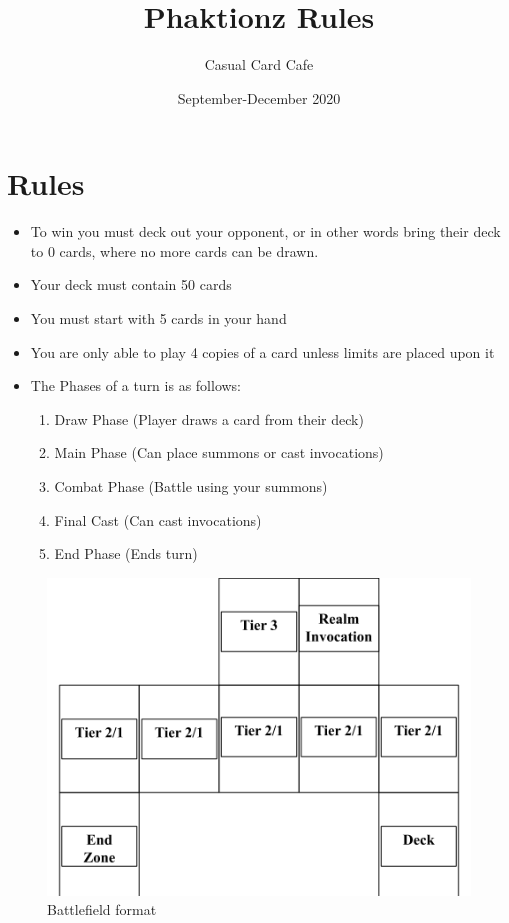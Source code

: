 \documentclass[12pt, letterpaper]{article}
\title{Phaktionz Rules}
\author{Casual Card Cafe}
\date{September-December 2020}
\begin{document}
\maketitle
{}
\newpage
\tableofcontents
\newpage
  \section{Rules}
  \begin{itemize}
      \item To win you must deck out your opponent, or in other words bring their deck to 0 cards, where
            no more cards can be drawn.
     \item Your deck must contain 50 cards
     \item You must start with 5 cards in your hand
     \item You are only able to play 4 copies of a card unless limits are placed upon it
     \item The Phases of a turn is as follows:
     \begin{enumerate}
         \item Draw Phase (Player draws a card from their deck)
         \item Main Phase (Can place summons or cast invocations)
         \item Combat Phase (Battle using your summons)
         \item Final Cast (Can cast invocations)
         \item End Phase (Ends turn)
     \end{enumerate}
  \end{itemize}
  \begin{figure}
  \begin{center}
     \includegraphics[scale=0.25]{field.png}
     \caption{Battlefield format} 
  \end{center}
   \end{figure}
   \newpage
\end{document}
